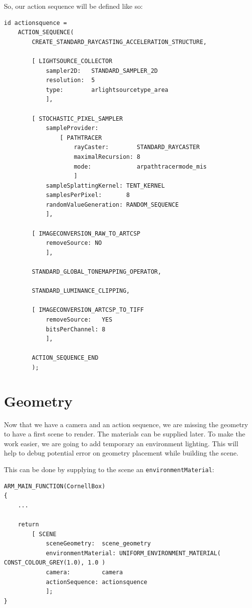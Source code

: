 \documentclass[a4paper,chapterprefix]{scrbook}
\begin{document}
So, our action sequence will be defined like so:
\begin{lstlisting}
id actionsquence = 
    ACTION_SEQUENCE(
        CREATE_STANDARD_RAYCASTING_ACCELERATION_STRUCTURE,
            
        [ LIGHTSOURCE_COLLECTOR
            sampler2D:   STANDARD_SAMPLER_2D
            resolution:  5
            type:        arlightsourcetype_area
            ],

        [ STOCHASTIC_PIXEL_SAMPLER
            sampleProvider:
                [ PATHTRACER
                    rayCaster:        STANDARD_RAYCASTER
                    maximalRecursion: 8
                    mode:             arpathtracermode_mis
                    ]
            sampleSplattingKernel: TENT_KERNEL
            samplesPerPixel:       8
            randomValueGeneration: RANDOM_SEQUENCE
            ],

        [ IMAGECONVERSION_RAW_TO_ARTCSP
            removeSource: NO
            ],

        STANDARD_GLOBAL_TONEMAPPING_OPERATOR,
                        
        STANDARD_LUMINANCE_CLIPPING,
            
        [ IMAGECONVERSION_ARTCSP_TO_TIFF
            removeSource:   YES
            bitsPerChannel: 8
            ],
            
        ACTION_SEQUENCE_END
        );
\end{lstlisting}

\section{Geometry}
Now that we have a camera and an action sequence, we are missing the geometry to have a first scene to render. The materials can be supplied later. To make the work easier, we are going to add temporary an environment lighting. This will help to debug potential error on geometry placement while building the scene.

This can be done by supplying to the scene an \verb?environmentMaterial?:

\begin{lstlisting}
ARM_MAIN_FUNCTION(CornellBox)
{
    ...
    
    return
        [ SCENE
            sceneGeometry:  scene_geometry
            environmentMaterial: UNIFORM_ENVIRONMENT_MATERIAL( CONST_COLOUR_GREY(1.0), 1.0 )
            camera:         camera
            actionSequence: actionsquence
            ];
}
\end{lstlisting}
\end{document}
